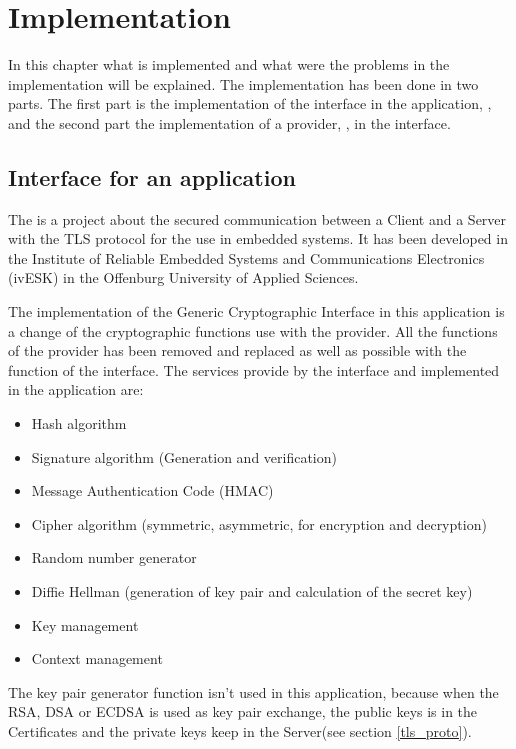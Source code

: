 \chapter{Implementation}
\label{imp}

In this chapter what is implemented and what were the problems in the
implementation will be explained.
The implementation has been done in two parts. The first part is the
implementation of the interface in the application, \embtls, and the second part
the implementation of a provider, \tomcrypt, in the interface.

\section{Interface for an application}

The \embtls is a project about the secured communication between a Client and a
Server with the TLS protocol for the use in embedded
systems. It has been developed in the Institute of Reliable Embedded Systems and
Communications Electronics (ivESK) in the Offenburg University of Applied Sciences.

The implementation of the Generic Cryptographic Interface in this application
is a change of the cryptographic functions use with the \tomcrypt provider. All
the functions of the \tomcrypt provider has been removed and replaced as well
as possible with the function of the interface.
The services provide by the interface and implemented in
the \embtls application are:
\begin{itemize}[noitemsep]
  \item Hash algorithm
  \item Signature algorithm (Generation and verification)
  \item Message Authentication Code (HMAC)
  \item Cipher algorithm (symmetric, asymmetric, for encryption and decryption)
  \item Random number generator
  \item Diffie Hellman (generation of key pair and calculation of the secret
  key)
  \item Key management
  \item Context management
\end{itemize}

The key pair generator function isn't used in this application, because when the
RSA, DSA or ECDSA is used as key pair exchange, the public keys
is in the Certificates and the private keys keep in the Server(see section
\ref{tls_proto}).

